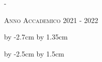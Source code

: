 \begin{titlingpage}
\begin{adjustwidth*}{\unitlength}{-\unitlength}
\begin{center}
\begin{center}
\end{center}




\vspace{3.75cm}


\textsc{Anno Accademico 2021 - 2022}\\[0.2cm]


\end{center}

\end{adjustwidth*}


\advance\hsize by -2.7cm %
\advance\hoffset by 1.35cm %


\end{titlingpage}


\advance\vsize by -2.5cm %
\advance\voffset by 1.5cm %






